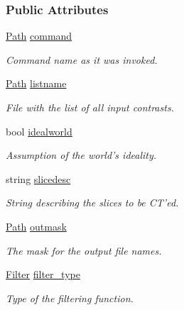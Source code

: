 \subsubsection*{Public Attributes}
\begin{DoxyCompactItemize}
\item 
\hyperlink{classPath}{Path} \hyperlink{structclargs_a37d3c372e8b8561d515d9f21ad71b5d6}{command}
\begin{DoxyCompactList}\small\item\em Command name as it was invoked. \item\end{DoxyCompactList}\item 
\hyperlink{classPath}{Path} \hyperlink{structclargs_a3adde5b0d161b47d7965175538422823}{listname}
\begin{DoxyCompactList}\small\item\em File with the list of all input contrasts. \item\end{DoxyCompactList}\item 
bool \hyperlink{structclargs_abbc893a8f8e9f79cf7f5edfd417ae68a}{idealworld}
\begin{DoxyCompactList}\small\item\em Assumption of the world's ideality. \item\end{DoxyCompactList}\item 
string \hyperlink{structclargs_af4d41991f44d2287ae4c479046e6729e}{slicedesc}
\begin{DoxyCompactList}\small\item\em String describing the slices to be CT'ed. \item\end{DoxyCompactList}\item 
\hyperlink{classPath}{Path} \hyperlink{structclargs_acb0988630de3d6fcdda6d826e3e2bfab}{outmask}
\begin{DoxyCompactList}\small\item\em The mask for the output file names. \item\end{DoxyCompactList}\item 
\hyperlink{classFilter}{Filter} \hyperlink{structclargs_ada865c8099ca2f31f421886e3ff8cc2b}{filter\_\-type}
\begin{DoxyCompactList}\small\item\em Type of the filtering function. \item\end{DoxyCompactList}\item 

\end{DoxyCompactItemize}
